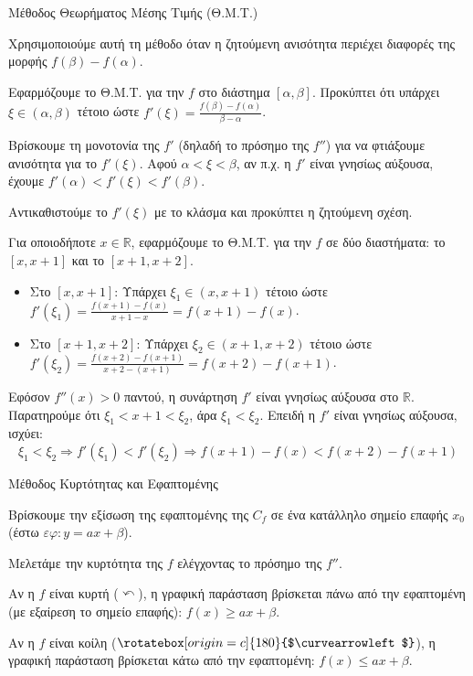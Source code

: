 \begin{askhsh}{Μέθοδος Θεωρήματος Μέσης Τιμής (Θ.Μ.Τ.)}
\bhmata\begin{bhma}
\item Χρησιμοποιούμε αυτή τη μέθοδο όταν η ζητούμενη ανισότητα περιέχει διαφορές της μορφής $f(\beta) - f(\alpha)$.
\item Εφαρμόζουμε το Θ.Μ.Τ. για την $f$ στο διάστημα $[\alpha, \beta]$. Προκύπτει ότι υπάρχει $\xi \in (\alpha, \beta)$ τέτοιο ώστε $f'(\xi) = \frac{f(\beta)-f(\alpha)}{\beta-\alpha}$.
\item Βρίσκουμε τη μονοτονία της $f'$ (δηλαδή το πρόσημο της $f''$) για να φτιάξουμε ανισότητα για το $f'(\xi)$. Αφού $\alpha < \xi < \beta$, αν π.χ. η $f'$ είναι γνησίως αύξουσα, έχουμε $f'(\alpha) < f'(\xi) < f'(\beta)$.
\item Αντικαθιστούμε το $f'(\xi)$ με το κλάσμα και προκύπτει η ζητούμενη σχέση.
\end{bhma}
\end{askhsh}


\lysh
Για οποιοδήποτε $x \in \mathbb{R}$, εφαρμόζουμε το Θ.Μ.Τ. για την $f$ σε δύο διαστήματα: το $[x, x+1]$ και το $[x+1, x+2]$. 
\begin{itemize}
    \item Στο $[x, x+1]$: Υπάρχει $\xi_1 \in (x, x+1)$ τέτοιο ώστε $f'(\xi_1) = \frac{f(x+1)-f(x)}{x+1-x} = f(x+1)-f(x)$.
    \item Στο $[x+1, x+2]$: Υπάρχει $\xi_2 \in (x+1, x+2)$ τέτοιο ώστε $f'(\xi_2) = \frac{f(x+2)-f(x+1)}{x+2-(x+1)} = f(x+2)-f(x+1)$.
\end{itemize}
Εφόσον $f''(x) > 0$ παντού, η συνάρτηση $f'$ είναι γνησίως αύξουσα στο $\mathbb{R}$.
Παρατηρούμε ότι $\xi_1 < x+1 < \xi_2$, άρα $\xi_1 < \xi_2$.
Επειδή η $f'$ είναι γνησίως αύξουσα, ισχύει:
\[ \xi_1 < \xi_2 \Rightarrow f'(\xi_1) < f'(\xi_2) \Rightarrow f(x+1) - f(x) < f(x+2) - f(x+1) \]

\begin{askhsh}{Μέθοδος Κυρτότητας και Εφαπτομένης}
\bhmata\begin{bhma}
\item Βρίσκουμε την εξίσωση της εφαπτομένης της $C_f$ σε ένα κατάλληλο σημείο επαφής $x_0$ (έστω $\varepsilon\varphi: y = ax + \beta$).
\item Μελετάμε την κυρτότητα της $f$ ελέγχοντας το πρόσημο της $f''$.
\item Αν η $f$ είναι κυρτή ($\curvearrowleft$), η γραφική παράσταση βρίσκεται πάνω από την εφαπτομένη (με εξαίρεση το σημείο επαφής): $f(x) \ge ax + \beta$.
\item Αν η $f$ είναι κοίλη ($\rotatebox[origin= c]{180}{$\curvearrowleft$}$), η γραφική παράσταση βρίσκεται κάτω από την εφαπτομένη: $f(x) \le ax + \beta$.
\end{bhma}
\end{askhsh}

